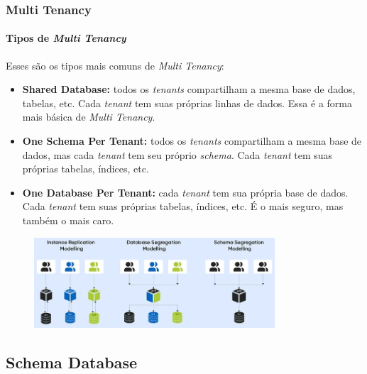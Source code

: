 \documentclass[
	9pt, %
	t, %
]{beamer}
\begin{document}
\begin{frame}
	\frametitle{Multi Tenancy}
	\framesubtitle{Tipos de \textit{Multi Tenancy}}

	Esses são os tipos mais comuns de \textit{Multi Tenancy}:

	\begin{itemize}
		\item \textbf{Shared Database:} todos os \textit{tenants} compartilham a mesma base de dados, tabelas, etc. Cada \textit{tenant} tem suas próprias linhas de dados. Essa é a forma mais básica de \textit{Multi Tenancy}.
		\item \textbf{One Schema Per Tenant:} todos os \textit{tenants} compartilham a mesma base de dados, mas cada \textit{tenant} tem seu próprio \textit{schema}. Cada \textit{tenant} tem suas próprias tabelas, índices, etc.
		\item \textbf{One Database Per Tenant:} cada \textit{tenant} tem sua própria base de dados. Cada \textit{tenant} tem suas próprias tabelas, índices, etc. É o mais seguro, mas também o mais caro.
	\end{itemize}

	\begin{figure}
		\centering
		\includegraphics[width=0.8\textwidth]{tenancy_types.png}
	\end{figure}

\end{frame}

\subsection{Schema Database}
\end{document}
